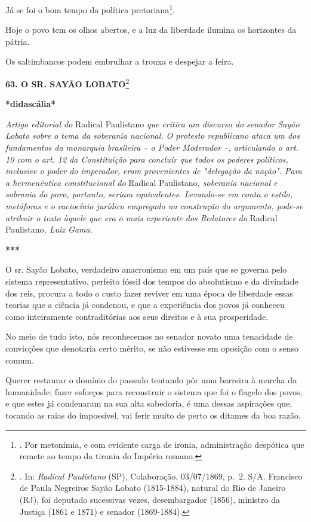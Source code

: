 Já se foi o bom tempo da política pretoriana\footnote{. Por metonímia, e
  com evidente carga de ironia, administração despótica que remete ao
  tempo da tirania do Império romano.}.

Hoje o povo tem os olhos abertos, e a luz da liberdade ilumina os
horizontes da pátria.

Os saltimbancos podem embrulhar a trouxa e despejar a feira.

\textbf{63. O SR. SAYÃO LOBATO}\footnote{. In: \emph{Radical Paulistano}
  (SP), Colaboração, 03/07/1869, p.~2. S/A. Francisco de Paula Negreiros
  Sayão Lobato (1815-1884), natural do Rio de Janeiro (RJ), foi deputado
  sucessivas vezes, desembargador (1856), ministro da Justiça (1861 e
  1871) e senador (1869-1884).}

\textbf{*didascália*}

\emph{Artigo editorial do} Radical Paulistano \emph{que critica um
discurso do senador Sayão Lobato sobre o tema da soberania nacional. O
protesto republicano ataca um dos fundamentos da monarquia brasileira --
o Poder Moderador --, articulando o art. 10 com o art. 12 da
Constituição para concluir que todos os poderes políticos, inclusive o
poder do imperador, eram provenientes de "delegação da nação". Para a
hermenêutica constitucional do} Radical Paulistano\emph{, soberania
nacional e sobrania do povo, portanto, seriam equivalentes. Levando-se
em conta o estilo, metáforas e o raciocínio jurídico empregado na
construção do argumento, pode-se atribuir o texto àquele que era o mais
experiente dos Redatores do} Radical Paulistano\emph{, Luiz Gama.}

\textbf{***}

O sr. Sayão Lobato, verdadeiro anacronismo em um país que se governa
pelo sistema representativo, perfeito fóssil dos tempos do absolutismo e
da divindade dos reis, procura a todo o custo fazer reviver em uma época
de liberdade essas teorias que a ciência já condenou, e que a
experiência dos povos já conheceu como inteiramente contraditórias aos
seus direitos e à sua prosperidade.

No meio de tudo isto, nós reconhecemos no senador novato uma tenacidade
de convicções que denotaria certo mérito, se não estivesse em oposição
com o senso comum.

Querer restaurar o domínio do passado tentando pôr uma barreira à marcha
da humanidade; fazer esforços para reconstruir o sistema que foi o
flagelo dos povos, e que estes já condenaram na sua alta sabedoria, é
uma dessas aspirações que, tocando as raias do impossível, vai ferir
muito de perto os ditames da boa razão.

